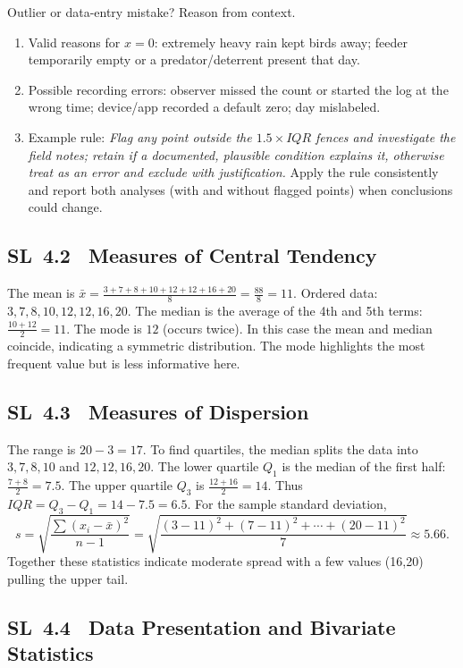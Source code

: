 \documentclass[11pt]{article}
\def\textbf#1{#1}%
\def\mathrm#1{#1}%
\newcommand{\tocsubsection}[1]{\subsection{#1}}
\begin{document}
\begin{solution}
\textbf{Outlier or data-entry mistake? Reason from context.}
\begin{enumerate}
  \item Valid reasons for $x=0$: extremely heavy rain kept birds away; feeder temporarily empty or a predator/deterrent present that day.
  \item Possible recording errors: observer missed the count or started the log at the wrong time; device/app recorded a default zero; day mislabeled.
  \item Example rule: \emph{Flag any point outside the $1.5\times\mathrm{IQR}$ fences and investigate the field notes; retain if a documented, plausible condition explains it, otherwise treat as an error and exclude with justification.} Apply the rule consistently and report both analyses (with and without flagged points) when conclusions could change.
\end{enumerate}
\end{solution}



\tocsubsection{SL 4.2 \; Measures of Central Tendency}

\begin{solution}
The mean is
\(\bar{x}=\frac{3+7+8+10+12+12+16+20}{8}=\frac{88}{8}=11\).  Ordered data:
$3,7,8,10,12,12,16,20$.  The median is the average of the 4th and 5th terms:
\(\tfrac{10+12}{2}=11\).  The mode is $12$ (occurs twice).  In this case the
mean and median coincide, indicating a symmetric distribution.  The mode
highlights the most frequent value but is less informative here.
\end{solution}

\tocsubsection{SL 4.3 \; Measures of Dispersion}



\begin{solution}
The range is $20-3=17$.  To find quartiles, the median splits the data into
\(3,7,8,10\) and \(12,12,16,20\).  The lower quartile $Q_1$ is the median of
the first half: $\tfrac{7+8}{2}=7.5$.  The upper quartile $Q_3$ is
\(\tfrac{12+16}{2}=14\).  Thus $\mathrm{IQR}=Q_3-Q_1=14-7.5=6.5$.
For the sample standard deviation,
\[s=\sqrt{\frac{\sum (x_i-\bar{x})^2}{n-1}}
  =\sqrt{\frac{(3-11)^2+(7-11)^2+\cdots+(20-11)^2}{7}}\approx5.66.
\]
Together these statistics indicate moderate spread with a few values (16,20)
pulling the upper tail.
\end{solution}

\tocsubsection{SL 4.4 \; Data Presentation and Bivariate Statistics}
\end{document}
